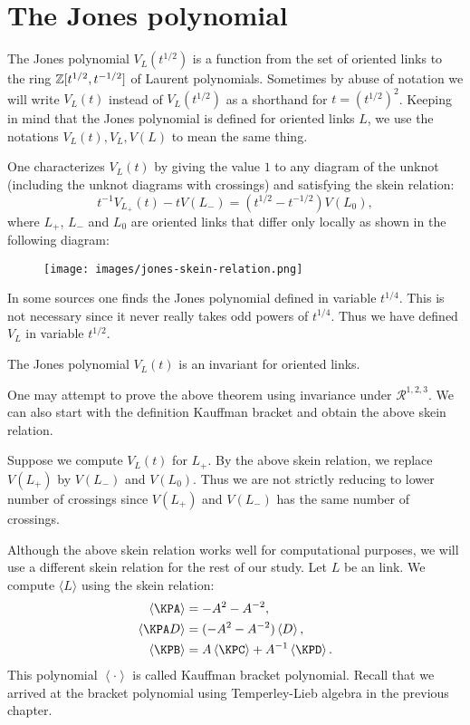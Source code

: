 \chapter{The Jones polynomial}
\label{chapter3}

The Jones polynomial $V_L(t^{1/2})$ is a function from the set of oriented links to the ring $\mathbb{Z}[t^{1/2}, t^{-1/2}]$ of Laurent polynomials. Sometimes by abuse of notation we will write $V_L(t)$ instead of $V_L(t^{1/2})$ as a shorthand for $t = (t^{1/2})^2$. Keeping in mind that the Jones polynomial is defined for oriented links $L$, we use the notations $V_L(t), V_L, V(L)$ to mean the same thing.

One characterizes $V_L(t)$ by giving the value $1$ to any diagram of the unknot (including the unknot diagrams with crossings) and satisfying the skein relation:
\begin{equation}
\label{2:eq:1}
  t^{-1}V_{L_+}(t) - tV(L_-) = (t^{1/2} - t^{-1/2})V(L_0),
\end{equation}
where $L_+$, $L_-$ and $L_0$ are oriented links that differ only locally as shown in the following diagram:

\begin{figure}[h]
  \centering
  \texttt{[image: images/jones-skein-relation.png]}
\end{figure}
 
In some sources one finds the Jones polynomial defined in variable $t^{1/4}$. This is not necessary since it never really takes odd powers of $t^{1/4}$. Thus we have defined $V_L$ in variable $t^{1/2}$.

\begin{theorem}
\label{cha:jones-polynomial}
  The Jones polynomial $V_L(t)$ is an invariant for oriented links.
\end{theorem}

One may attempt to prove the above theorem using invariance under $\mathcal{R}^{1,2,3}$. We can also start with the definition Kauffman bracket and obtain the above skein relation. 

\begin{remark}
\label{cha:jones-polynomial-1}
  Suppose we compute $V_L(t)$ for $L_+$. By the above skein relation, we replace $V(L_+)$ by $V(L_-)$ and $V(L_0)$. Thus we are not strictly reducing to lower number of crossings since $V(L_+)$ and $V(L_-)$ has the same number of crossings.
\end{remark}

Although the above skein relation works well for computational purposes, we will use a different skein relation for the rest of our study. Let $L$ be an link. We compute $\langle L \rangle$ using the skein relation:
\begin{align*}
  \left< \KPA \right> &= -A^2 - A^{-2}, \\
  \left< \KPA D \right> &= (-A^2 - A^{-2}) \left< D \right>, \\
  \left< \KPB \right> &= A\left< \KPC \right> + A^{-1}\left< \KPD \right>.
\end{align*}
This polynomial $\left< \cdot \right>$ is called Kauffman bracket polynomial. Recall that we arrived at the bracket polynomial using Temperley-Lieb algebra in the previous chapter. 

